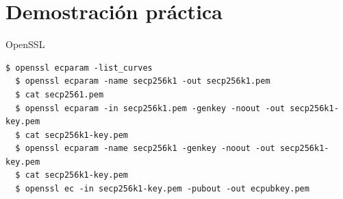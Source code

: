 \documentclass[12pt]{beamer}
\begin{document}
\section{Demostración práctica}\label{demo}
\begin{frame}[fragile]{OpenSSL}
\begin{Verbatim}[breaklines=true]
  $ openssl ecparam -list_curves
  $ openssl ecparam -name secp256k1 -out secp256k1.pem
  $ cat secp2561.pem
  $ openssl ecparam -in secp256k1.pem -genkey -noout -out secp256k1-key.pem
  $ cat secp256k1-key.pem 
  $ openssl ecparam -name secp256k1 -genkey -noout -out secp256k1-key.pem
  $ cat secp256k1-key.pem
  $ openssl ec -in secp256k1-key.pem -pubout -out ecpubkey.pem
\end{Verbatim}

\end{frame}
\end{document}
